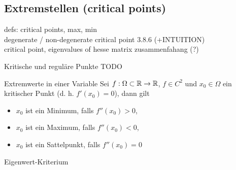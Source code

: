 
\subsection{Extremstellen (critical points)}

defs: critical points, max, min\\

degenerate / non-degenerate critical point 3.8.6 (+INTUITION)\\

critical point, eigenvalues of hesse matrix zusammenfahang (?)\\

\begin{Definition}[label=R1]{Kritische und reguläre Punkte}{}
	TODO
\end{Definition}

\begin{Satz}{Extremwerte in einer Variable}{}
	Sei $f: \Omega \subset \mathbb{R} \to \mathbb{R}$, $f \in C^2$ und $x_0 \in \Omega$ ein kritischer Punkt (d. h. $f'(x_0) = 0$), dann gilt
	\begin{itemize}
		\item $x_0$ ist ein Minimum, falls $f''(x_0) > 0$,
		\item $x_0$ ist ein Maximum, falls $f''(x_0) < 0$,
		\item $x_0$ ist ein Sattelpunkt, falls $f''(x_0) = 0$
	\end{itemize}
\end{Satz}

\begin{Satz}{Eigenwert-Kriterium}{}
	
\end{Satz}

